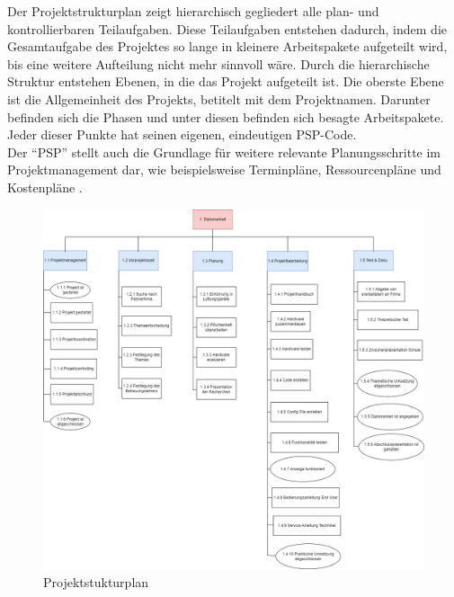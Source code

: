 Der Projektstrukturplan zeigt hierarchisch gegliedert alle plan- und kontrollierbaren Teilaufgaben. Diese Teilaufgaben entstehen dadurch, indem die Gesamtaufgabe des Projektes so lange in kleinere Arbeitspakete aufgeteilt wird, bis eine weitere Aufteilung nicht mehr sinnvoll wäre. Durch die hierarchische Struktur entstehen Ebenen, in die das Projekt aufgeteilt ist. Die oberste Ebene ist die Allgemeinheit des Projekts, betitelt mit dem Projektnamen. Darunter befinden sich die Phasen und unter diesen befinden sich besagte Arbeitspakete. Jeder dieser Punkte hat seinen eigenen, eindeutigen PSP-Code.
\\Der \enquote{PSP} stellt auch die Grundlage für weitere relevante Planungsschritte im Projektmanagement dar, wie beispielsweise Terminpläne, Ressourcenpläne und Kostenpläne \cite{Kindl_Niels:2023}.

\begin{figure}[H]
	\centering
	\includegraphics[width=1\linewidth]{Bilder/projektstrukturplan}
	\caption{Projektstukturplan}
	\label{fig:projektstrukturplan}
\end{figure}